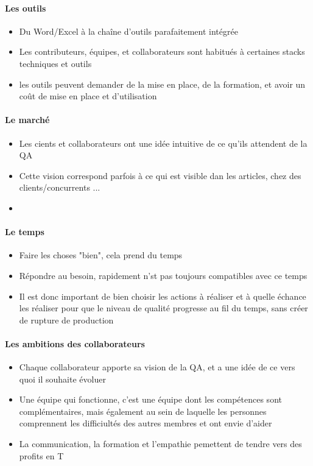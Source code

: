 \begin{frame}{\insertsectionhead}
  \framesubtitle{Les outils}
  \begin{itemize}
    \item Du Word/Excel à la chaîne d'outils parafaitement intégrée
    \item Les contributeurs, équipes, et collaborateurs sont habitués à certaines stacks techniques et outils
    \item les outils peuvent demander de la mise en place, de la formation, et avoir un coût de mise en place et d'utilisation
  \end{itemize}
\end{frame}

\begin{frame}{\insertsectionhead}
  \framesubtitle{Le marché}
  \begin{itemize}
    \item Les cients et collaborateurs ont une idée intuitive de ce qu'ils attendent de la QA
    \item Cette vision correspond parfois à ce qui est visible dan les articles, chez des clients/concurrents ...
    \item 
  \end{itemize}
\end{frame}

\begin{frame}{\insertsectionhead}
  \framesubtitle{Le temps}
  \begin{itemize}
    \item Faire les choses "bien", cela prend du temps
    \item Répondre au besoin, rapidement n'st pas toujours compatibles avec ce temps
    \item Il est donc important de bien choisir les actions à réaliser et à quelle échance les réaliser pour que le niveau de qualité progresse au fil du temps, sans créer de rupture de production
  \end{itemize}
\end{frame}

\begin{frame}{\insertsectionhead}
  \framesubtitle{Les ambitions des collaborateurs}
  \begin{itemize}
    \item Chaque collaborateur apporte sa vision de la QA, et a une idée de ce vers quoi il souhaite évoluer
    \item Une équipe qui fonctionne, c'est une équipe dont les compétences sont complémentaires, mais également au sein de laquelle les personnes comprennent les difficiultés des autres membres et ont envie d'aider
    \item La communication, la formation et l'empathie pemettent de tendre vers des profits en T
  \end{itemize}
\end{frame}


